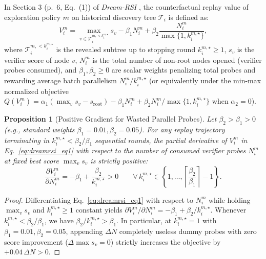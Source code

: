 \documentclass[11pt,a4paper]{article}
\newtheorem{proposition}{Proposition}
\begin{document}
In Section 3 (p.~6, Eq.~(1)) of \emph{Dream-RSI} \cite{dreamrsi2026}, the counterfactual replay value of exploration policy $m$ on historical discovery tree $\mathcal{T}_i$ is defined as:
\begin{equation}
V_i^m = \max_{v \in \mathcal{T}_i^{m, < k_i^{m,\star}}} s_v - \beta_1 N_i^m + \beta_2 \frac{N_i^m}{\max\{1, k_i^{m,\star}\}},
\tag{1}\label{eq:dreamrsi_eq1}
\end{equation}
where $\mathcal{T}_i^{m, < k_i^{m,\star}}$ is the revealed subtree up to stopping round $k_i^{m,\star} \ge 1$, $s_v$ is the verifier score of node $v$, $N_i^m$ is the total number of non-root nodes opened (verifier probes consumed), and $\beta_1, \beta_2 \ge 0$ are scalar weights penalizing total probes and rewarding average batch parallelism $N_i^m / k_i^{m,\star}$ (or equivalently under the min-max normalized objective $Q(V_i^m) = \alpha_1(\max_v s_v - s_{\text{root}}) - \beta_1 N_i^m + \beta_2 N_i^m / \max\{1, k_i^{m,\star}\}$ when $\alpha_2 = 0$).

\begin{proposition}[Positive Gradient for Wasted Parallel Probes]
\label{prop:probe_spam}
Let $\beta_2 > \beta_1 > 0$ (e.g., standard weights $\beta_1 = 0.01, \beta_2 = 0.05$). For any replay trajectory terminating in $k_i^{m,\star} < \beta_2 / \beta_1$ sequential rounds, the partial derivative of $V_i^m$ in Eq.~\eqref{eq:dreamrsi_eq1} with respect to the number of consumed verifier probes $N_i^m$ at fixed best score $\max_v s_v$ is strictly positive:
\begin{equation}
\frac{\partial V_i^m}{\partial N_i^m} = -\beta_1 + \frac{\beta_2}{k_i^{m,\star}} > 0 \qquad \forall\, k_i^{m,\star} \in \left\{1, \dots, \left\lceil \frac{\beta_2}{\beta_1} \right\rceil - 1\right\}.
\tag{2}\label{eq:probe_spam_grad}
\end{equation}
\end{proposition}
\begin{proof}
Differentiating Eq.~\eqref{eq:dreamrsi_eq1} with respect to $N_i^m$ while holding $\max_v s_v$ and $k_i^{m,\star} \ge 1$ constant yields $\partial V_i^m / \partial N_i^m = -\beta_1 + \beta_2 / k_i^{m,\star}$. Whenever $k_i^{m,\star} < \beta_2 / \beta_1$, we have $\beta_2 / k_i^{m,\star} > \beta_1$. In particular, at $k_i^{m,\star} = 1$ with $\beta_1 = 0.01, \beta_2 = 0.05$, appending $\Delta N$ completely useless dummy probes with zero score improvement ($\Delta \max s_v = 0$) strictly increases the objective by $+0.04\,\Delta N > 0$.
\end{proof}
\end{document}
